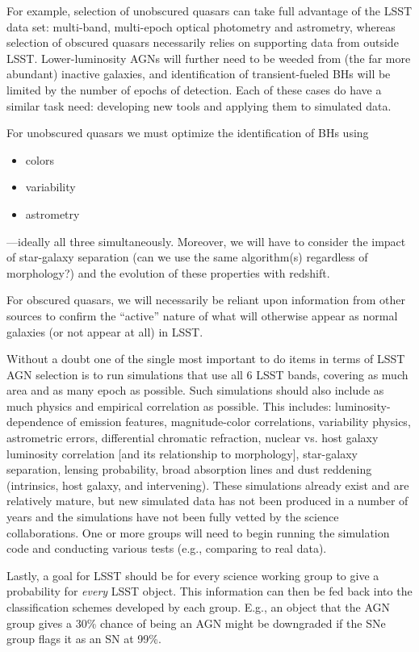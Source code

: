 For example, selection of unobscured quasars can take full advantage
of the LSST data set: multi-band, multi-epoch optical photometry and
astrometry, whereas selection of obscured quasars necessarily relies
on supporting data from outside LSST.  Lower-luminosity AGNs will
further need to be weeded from (the far more abundant) inactive
galaxies, and identification of transient-fueled BHs will be limited
by the number of epochs of detection.  Each of these cases do have a
similar task need: developing new tools and applying them to simulated
data.

For unobscured quasars we must optimize the identification of BHs using
\begin{itemize}
\item colors
\item variability
\item astrometry
\end{itemize}
---ideally all three simultaneously.  Moreover, we will have to
consider the impact of star-galaxy separation (can we use the same
algorithm(s) regardless of morphology?) and the evolution of these
properties with redshift.

For obscured quasars, we will necessarily be reliant upon information
from other sources to confirm the ``active'' nature of what will
otherwise appear as normal galaxies (or not appear at all) in LSST.

Without a doubt one of the single most important to do items in terms of LSST AGN selection is to run simulations that use all 6 LSST bands, covering as much area and as many epoch as possible.  Such simulations should also include as much physics and empirical correlation as possible.  This includes: luminosity-dependence of emission features, magnitude-color correlations, variability physics, astrometric errors, differential chromatic refraction, nuclear vs. host galaxy luminosity correlation [and its relationship to morphology], star-galaxy separation, lensing probability, broad absorption lines and dust reddening (intrinsics, host galaxy, and intervening).  These simulations already exist and are relatively mature, but new simulated data has not been produced in a number of years and the simulations have not been fully vetted by the science collaborations.  One or more groups will need to begin running the simulation code and conducting various tests (e.g., comparing to real data).

Lastly, a goal for LSST should be for every science working group to give a probability for {\em every} LSST object.  This information can then be fed back into the classification schemes developed by each group.  E.g., an object that the AGN group gives a 30\% chance of being an AGN might be downgraded if the SNe group flags it as an SN at 99\%.

